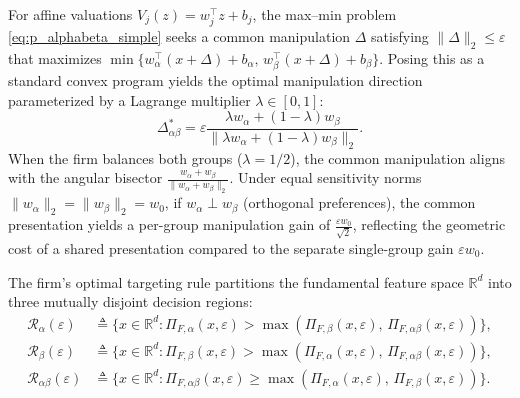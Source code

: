 \begin{remark}
\label{rem:joint_manipulation}
For affine valuations $V_j(z) = w_j^\top z + b_j$, the max--min problem \eqref{eq:p_alphabeta_simple} seeks a common manipulation $\Delta$ satisfying $\|\Delta\|_2 \le \varepsilon$ that maximizes $\min\{w_\alpha^\top(x+\Delta) + b_\alpha,\, w_\beta^\top(x+\Delta) + b_\beta\}$. Posing this as a standard convex program yields the optimal manipulation direction parameterized by a Lagrange multiplier $\lambda \in [0,1]$:
\begin{equation}
\Delta_{\alpha\beta}^* = \varepsilon \frac{\lambda w_\alpha + (1-\lambda) w_\beta}{\|\lambda w_\alpha + (1-\lambda) w_\beta\|_2}.
\end{equation}
When the firm balances both groups ($\lambda = 1/2$), the common manipulation aligns with the angular bisector $\frac{w_\alpha + w_\beta}{\|w_\alpha + w_\beta\|_2}$. Under equal sensitivity norms $\|w_\alpha\|_2 = \|w_\beta\|_2 = w_0$, if $w_\alpha \perp w_\beta$ (orthogonal preferences), the common presentation yields a per-group manipulation gain of $\frac{\varepsilon w_0}{\sqrt{2}}$, reflecting the geometric cost of a shared presentation compared to the separate single-group gain $\varepsilon w_0$.
\end{remark}
The firm's optimal targeting rule partitions the fundamental feature space $\mathbb{R}^d$ into three mutually disjoint decision regions:
\begin{align}
\mathcal{R}_\alpha(\varepsilon) &\triangleq \bigl\{x \in \mathbb{R}^d : \Pi_{F,\alpha}(x,\varepsilon) > \max(\Pi_{F,\beta}(x,\varepsilon),\, \Pi_{F,\alpha\beta}(x,\varepsilon))\bigr\}, \\
\mathcal{R}_\beta(\varepsilon) &\triangleq \bigl\{x \in \mathbb{R}^d : \Pi_{F,\beta}(x,\varepsilon) > \max(\Pi_{F,\alpha}(x,\varepsilon),\, \Pi_{F,\alpha\beta}(x,\varepsilon))\bigr\}, \\
\mathcal{R}_{\alpha\beta}(\varepsilon) &\triangleq \bigl\{x \in \mathbb{R}^d : \Pi_{F,\alpha\beta}(x,\varepsilon) \ge \max(\Pi_{F,\alpha}(x,\varepsilon),\, \Pi_{F,\beta}(x,\varepsilon))\bigr\}.
\end{align}


